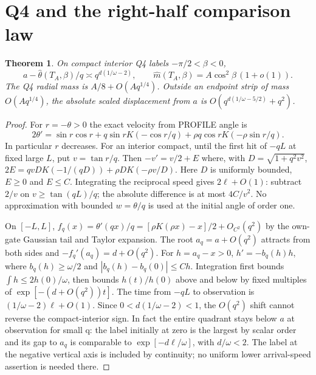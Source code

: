 \documentclass[11pt]{article}
\newtheorem{theorem}{Theorem}\newtheorem{lemma}{Lemma}
\begin{document}
\section{Q4 and the right-half comparison law}\label{an04rpsv1:entry}
\begin{theorem}\label{an04rpsv1:q4}
On compact interior Q4 labels \(-\pi/2<\beta<0\),
\[
 a-\widehat\theta(T_A,\beta)/q\asymp
 q^{d(1/\omega-2)},\qquad
 \widehat m(T_A,\beta)=A\cos^2\beta\,(1+o(1)).
\]
The Q4 radial mass is \(A/8+O(Aq^{1/4})\). Outside an endpoint
strip of mass \(O(Aq^{1/4})\), the absolute scaled displacement from
\(a\) is \(O(q^{d(1/\omega-5/2)}+q^2)\).
\end{theorem}
\begin{proof}
For \(r=-\theta>0\) the exact velocity from PROFILE angle is
\[
 2\theta'=\sin r\cos r+q\sin r K(-\cos r/q)
                      +\rho q\cos r K(-\rho\sin r/q).
\]
In particular \(r\) decreases. For an interior compact, until the
first hit of \(-qL\) at fixed large \(L\), put \(v=\tan r/q\).
Then \(-v'=v/2+E\) where, with \(D=\sqrt{1+q^2v^2}\),
\(2E=qvD K(-1/(qD))+\rho D K(-\rho v/D)\).
Here \(D\) is uniformly bounded, \(E\ge0\) and \(E\le C\).
Integrating the reciprocal speed gives \(2\ell+O(1)\):
subtract \(2/v\) on \(v\ge\tan(qL)/q\); the absolute difference is
at most \(4C/v^2\). No approximation with bounded \(w=\theta/q\)
is used at the initial angle of order one.

On \([-L,L]\), \(f_q(x)=\theta'(qx)/q
=[\rho K(\rho x)-x]/2+O_{C^2}(q^2)\) by the own-gate
Gaussian tail and Taylor expansion. The root \(a_q=a+O(q^2)\)
attracts from both sides and \(-f_q'(a_q)=d+O(q^2)\).
For \(h=a_q-x>0\), \(h'=-b_q(h)h\), where
\(b_q(h)\ge\omega/2\) and
\(|b_q(h)-b_q(0)|\le C h\). Integration first bounds
\(\int h\le2h(0)/\omega\), then bounds \(h(t)/h(0)\) above and below
by fixed multiples of \(\exp[-(d+O(q^2))t]\).
The time from \(-qL\) to observation is
\((1/\omega-2)\ell+O(1)\). Since \(0<d(1/\omega-2)<1\),
the \(O(q^2)\) shift cannot reverse the compact-interior sign.
In fact the entire quadrant stays below \(a\) at observation for small
q: the label initially at zero is the largest by scalar order and its
gap to \(a_q\) is comparable to \(\exp[-d\ell/\omega]\), with
\(d/\omega<2\). The label at the negative vertical axis is included
by continuity; no uniform lower arrival-speed assertion is needed there.


\end{proof}
\end{document}
